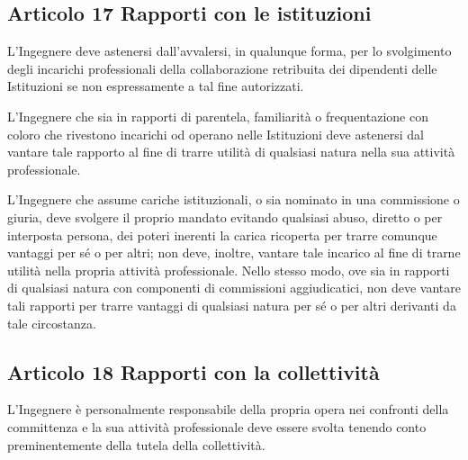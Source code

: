 \documentclass[letterpaper,10pt,italian]{sphinxmanual}
\begin{document}
\subsection{Articolo 17 \sphinxhyphen{} Rapporti con le istituzioni}
\label{\detokenize{capitoli/codice/codice_deontologico:articolo-17-rapporti-con-le-istituzioni}}\begin{description}
\sphinxAtStartPar
L’Ingegnere deve astenersi dall’avvalersi, in qualunque forma, per lo svolgimento degli incarichi professionali della collaborazione retribuita dei dipendenti delle Istituzioni se non espressamente a tal fine autorizzati.

\sphinxAtStartPar
L’Ingegnere che sia in rapporti di parentela, familiarità o frequentazione con coloro che rivestono incarichi od operano nelle Istituzioni deve astenersi dal vantare tale rapporto al fine di trarre utilità di qualsiasi natura nella sua attività professionale.

\sphinxAtStartPar
L’Ingegnere che assume cariche istituzionali, o sia nominato in una commissione o giuria, deve svolgere il proprio mandato evitando qualsiasi abuso, diretto o per interposta persona, dei poteri inerenti la carica ricoperta per trarre comunque vantaggi per sé o per altri; non deve, inoltre, vantare tale incarico al fine di trarne utilità nella propria attività professionale. Nello stesso modo, ove sia in rapporti di qualsiasi natura con componenti di commissioni aggiudicatici, non deve vantare tali rapporti per trarre vantaggi di qualsiasi natura per sé o per altri derivanti da tale circostanza.

\end{description}


\subsection{Articolo 18 \sphinxhyphen{} Rapporti con la collettività}
\label{\detokenize{capitoli/codice/codice_deontologico:articolo-18-rapporti-con-la-collettivita}}\begin{description}
\sphinxAtStartPar
L’Ingegnere è personalmente responsabile della propria opera nei confronti della committenza e la sua attività professionale deve essere svolta tenendo conto preminentemente della tutela della collettività.

\end{description}
\end{document}
